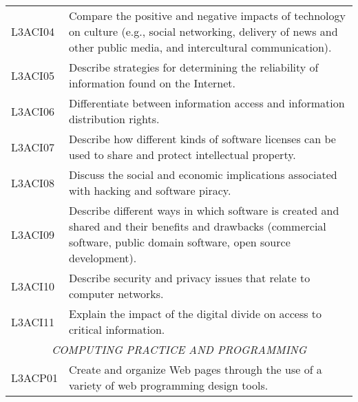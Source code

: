 \begin{longtable}{p{1.8cm}p{11cm}}
 L3ACI04 & Compare the positive and negative impacts of technology on culture (e.g., social networking, delivery of news and other public media, and intercultural communication).                                                    \\
 L3ACI05 & Describe strategies for determining the reliability of information found on the Internet.                                                                                                                                  \\
 L3ACI06 & Differentiate between information access and information distribution rights.                                                                                                                                              \\
 L3ACI07 & Describe how different kinds of software licenses can be used to share and protect intellectual property.                                                                                                                  \\
 L3ACI08 & Discuss the social and economic implications associated with hacking and software piracy.                                                                                                                                  \\
 L3ACI09 & Describe different ways in which software is created and shared and their benefits and drawbacks (commercial software, public domain software, open source development).                                                   \\
 L3ACI10 & Describe security and privacy issues that relate to computer networks.                                                                                                                                                     \\
 L3ACI11 & Explain the impact of the digital divide on access to critical information.                                                                                                                                                \\
 \multicolumn{2}{c}{\textit{COMPUTING PRACTICE AND PROGRAMMING}}                                                                                                                                                                                        \\
 L3ACP01 & Create and organize Web pages through the use of a variety of web programming design tools.                                                                                                                                \\

\end{longtable}
